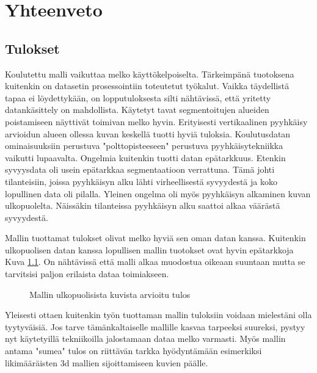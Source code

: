 \chapter{Yhteenveto}%
\label{ch:yhteenveto}

\section{Tulokset}

Koulutettu malli vaikuttaa melko käyttökelpoiselta. Tärkeimpänä tuotoksena kuitenkin on datasetin prosessointiin toteutetut työkalut.
Vaikka täydellistä tapaa ei löydettykään, on lopputuloksesta silti nähtävissä, että yritetty datankäsittely on mahdollista.
Käytetyt tavat segmentoitujen alueiden poistamiseen näyttivät toimivan melko hyvin.
Erityisesti vertikaalinen pyyhkäisy arvioidun alueen ollessa kuvan keskellä tuotti hyviä tuloksia.
Koulutusdatan ominaisuuksiin perustuva "polttopisteeseen" perustuva pyyhkäisytekniikka vaikutti lupaavalta.
Ongelmia kuitenkin tuotti datan epätarkkuus.
Etenkin syvyysdata oli usein epätarkkaa segmentaatioon verrattuna.
Tämä johti tilanteisiin, joissa pyyhkäisyn alku lähti virheellisestä syvyydestä ja koko lopullinen data oli pilalla. 
Yleinen ongelma oli myös pyyhkäisyn alkaminen kuvan ulkopuolelta.
Näissäkin tilanteissa pyyhkäisyn alku saattoi alkaa väärästä syvyydestä.

Mallin tuottamat tulokset olivat melko hyviä sen oman datan kanssa.
Kuitenkin ulkopuolisen datan kanssa lopullisen mallin tuotokset ovat hyvin epätarkkoja Kuva \ref{fig:ulkoinen}.
On nähtävissä että malli alkaa muodostua oikeaan suuntaan mutta se tarvitsisi paljon erilaista dataa toimiakseen.

\begin{figure}[h]
\centering
{}
\caption{Mallin ulkopuolisista kuvista arvioitu tulos}
\label{fig:ulkoinen}
\end{figure}

Yleisesti ottaen kuitenkin työn tuottaman mallin tuloksiin voidaan mielestäni olla tyytyväisiä.
Jos tarve tämänkaltaiselle mallille kasvaa tarpeeksi suureksi, pystyy nyt käytetyillä tekniikoilla jalostamaan dataa melko varmasti.
Myös mallin antama "sumea" tulos on riittävän tarkka hyödyntämään esimerkiksi likimääräisten 3d mallien sijoittamiseen kuvien päälle.

